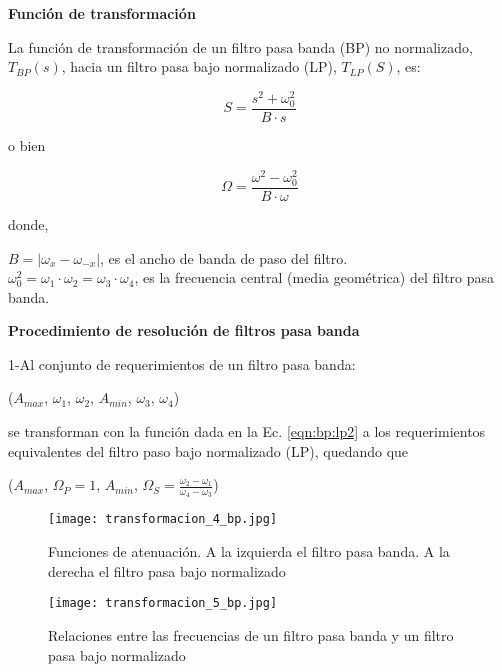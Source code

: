 \documentclass[informe.tex]{subfiles}
\begin{document}
\textbf{Función de transformación}\newline

La función de transformación de un filtro pasa banda (BP) no normalizado, $T_{BP}(s)$, hacia un filtro pasa bajo normalizado (LP), $T_{LP}(S)$, es:
	
	\begin{equation}
		\label{eqn:bp:lp1}	
		S=\frac{s^2 + \omega_0^2}{B \cdot s}
	\end{equation}
	
o bien
	
	\begin{equation}
		\label{eqn:bp:lp2}	
		\Omega = \frac{ \omega^2 - \omega_0^2}{B \cdot \omega}	
	\end{equation}
		
donde,
	
	\begin{tabbing}
		$B=|\omega_{x} - \omega_{-x}|$, es el ancho de banda de paso del filtro. \\
		$\omega_0^2=\omega_1 \cdot \omega_2 =\omega_3 \cdot \omega_4 $, es la frecuencia central (media geométrica) del filtro pasa banda.
	\end{tabbing}

		
\textbf{\newline Procedimiento de resolución de filtros pasa banda}\newline

	1-Al conjunto de requerimientos de un filtro pasa banda:
	\begin{center}			 
				($A_{max}$, $\omega_1$, $\omega_2$, $A_{min}$, $\omega_3$, $\omega_4$)
	\end{center}
se transforman con la función dada en la Ec. \ref{eqn:bp:lp2} a los requerimientos equivalentes del filtro paso bajo normalizado (LP), quedando que
    \begin{center}
				($A_{max}$, $\Omega_P=1$, $A_{min}$, 
				  $\Omega_S=\frac{\omega_2 - \omega_1}
				                 {\omega_4 - \omega_3}
				  $)
    \end{center}				
	
	\begin{figure}[h]
		\centering
		\texttt{[image: transformacion\_4\_bp.jpg]}
		\caption{Funciones de atenuación. A la izquierda el filtro pasa banda. A la derecha el filtro pasa bajo normalizado}
		\label{fig:transformacion:bp:func_att}
	\end{figure}	
		
	\begin{figure}[h]
		\centering
		\texttt{[image: transformacion\_5\_bp.jpg]}
		\caption{Relaciones entre las frecuencias de un filtro pasa banda y un filtro pasa bajo normalizado}
		\label{fig:transformacion:bp:relaciones}
	\end{figure}		
\end{document}
